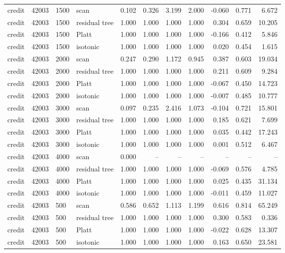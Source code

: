 \begin{tabular}{lrllrrrrrrr}
credit & 42003 & 1500 & scan & 0.102 & 0.326 & 3.199 & 2.000 & -0.060 & 0.771 & 6.672 \\
credit & 42003 & 1500 & residual tree & 1.000 & 1.000 & 1.000 & 1.000 & 0.304 & 0.659 & 10.205 \\
credit & 42003 & 1500 & Platt & 1.000 & 1.000 & 1.000 & 1.000 & -0.166 & 0.412 & 5.846 \\
credit & 42003 & 1500 & isotonic & 1.000 & 1.000 & 1.000 & 1.000 & 0.020 & 0.454 & 1.615 \\
credit & 42003 & 2000 & scan & 0.247 & 0.290 & 1.172 & 0.945 & 0.387 & 0.603 & 19.034 \\
credit & 42003 & 2000 & residual tree & 1.000 & 1.000 & 1.000 & 1.000 & 0.211 & 0.609 & 9.284 \\
credit & 42003 & 2000 & Platt & 1.000 & 1.000 & 1.000 & 1.000 & -0.067 & 0.450 & 14.723 \\
credit & 42003 & 2000 & isotonic & 1.000 & 1.000 & 1.000 & 1.000 & -0.007 & 0.485 & 10.777 \\
credit & 42003 & 3000 & scan & 0.097 & 0.235 & 2.416 & 1.073 & -0.104 & 0.721 & 15.801 \\
credit & 42003 & 3000 & residual tree & 1.000 & 1.000 & 1.000 & 1.000 & 0.185 & 0.621 & 7.699 \\
credit & 42003 & 3000 & Platt & 1.000 & 1.000 & 1.000 & 1.000 & 0.035 & 0.442 & 17.243 \\
credit & 42003 & 3000 & isotonic & 1.000 & 1.000 & 1.000 & 1.000 & 0.001 & 0.512 & 6.467 \\
credit & 42003 & 4000 & scan & 0.000 & -- & -- & -- & -- & -- & -- \\
credit & 42003 & 4000 & residual tree & 1.000 & 1.000 & 1.000 & 1.000 & -0.069 & 0.576 & 4.785 \\
credit & 42003 & 4000 & Platt & 1.000 & 1.000 & 1.000 & 1.000 & 0.025 & 0.435 & 31.134 \\
credit & 42003 & 4000 & isotonic & 1.000 & 1.000 & 1.000 & 1.000 & -0.011 & 0.459 & 11.027 \\
credit & 42003 & 500 & scan & 0.586 & 0.652 & 1.113 & 1.199 & 0.616 & 0.814 & 65.249 \\
credit & 42003 & 500 & residual tree & 1.000 & 1.000 & 1.000 & 1.000 & 0.300 & 0.583 & 0.336 \\
credit & 42003 & 500 & Platt & 1.000 & 1.000 & 1.000 & 1.000 & -0.022 & 0.628 & 13.307 \\
credit & 42003 & 500 & isotonic & 1.000 & 1.000 & 1.000 & 1.000 & 0.163 & 0.650 & 23.581 \\

\end{tabular}

